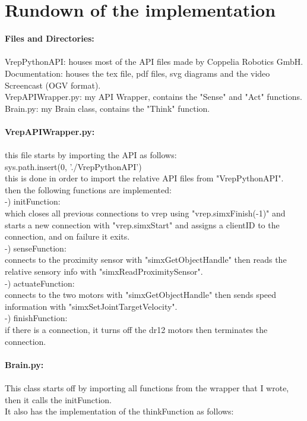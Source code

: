 \documentclass[10pt]{article}
\begin{document}
\section{Rundown of the implementation}
\textbf{Files and Directories:}\\\\
VrepPythonAPI: houses most of the API files made by Coppelia Robotics GmbH.\\
Documentation: houses the tex file, pdf files, svg diagrams and the video Screencast (OGV format).\\
VrepAPIWrapper.py: my API Wrapper, contains the "Sense" and "Act" functions.\\
Brain.py: my Brain class, contains the "Think" function.\\\\
\textbf{VrepAPIWrapper.py:}\\\\
this file starts by importing the API as follows:\\
sys.path.insert(0, './VrepPythonAPI')\\
this is done in order to import the relative API files from "VrepPythonAPI".\\
then the following functions are implemented:\\
-) initFunction:\\
which closes all previous connections to vrep using "vrep.simxFinish(-1)" and starts a new connection with "vrep.simxStart" and assigns a clientID to the connection, and on failure it exits.\\
-) senseFunction:\\
connects to the proximity sensor with "simxGetObjectHandle" then reads the relative sensory info with "simxReadProximitySensor".\\
-) actuateFunction:\\
connects to the two motors with "simxGetObjectHandle" then sends speed information with "simxSetJointTargetVelocity".\\
-) finishFunction:\\
if there is a connection, it turns off the dr12 motors then terminates the connection.\\\\
\newpage
\textbf{Brain.py:}\\\\
This class starts off by importing all functions from the wrapper that I wrote, then it calls the initFunction.\\
It also has the implementation of the thinkFunction as follows:\\
\end{document}
